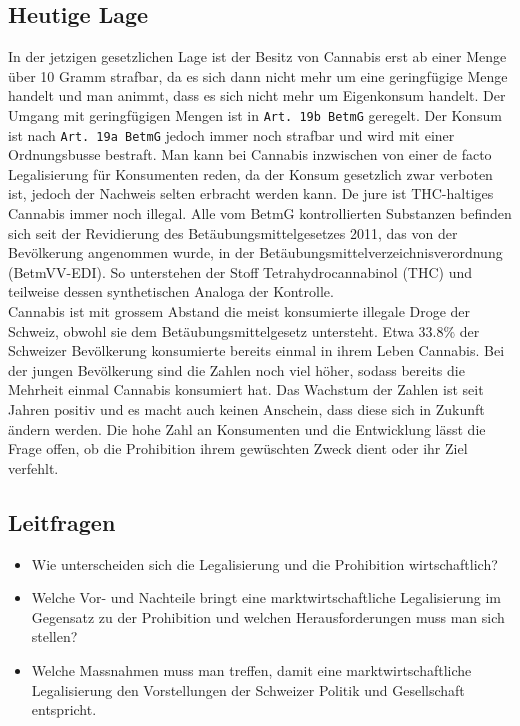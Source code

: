 \documentclass[../main.tex]{subfiles}
\begin{document}
	 
	 \subsection{Heutige Lage}
	 In der jetzigen gesetzlichen Lage ist der Besitz von Cannabis erst ab einer Menge über 10 Gramm strafbar, da es sich dann nicht mehr um eine geringfügige Menge handelt und man animmt, dass es sich nicht mehr um Eigenkonsum handelt.
	 Der Umgang mit geringfügigen Mengen ist in \texttt{Art. 19b BetmG} geregelt.
	 Der Konsum ist nach \texttt{Art. 19a BetmG} jedoch immer noch strafbar und wird mit einer Ordnungsbusse bestraft. 
	 Man kann bei Cannabis inzwischen von einer de facto Legalisierung für Konsumenten reden, da der Konsum gesetzlich zwar verboten ist, jedoch der Nachweis selten erbracht werden kann. 
	 De jure ist THC-haltiges Cannabis immer noch illegal. 
	 Alle vom BetmG kontrollierten Substanzen befinden sich seit der Revidierung des Betäubungsmittelgesetzes 2011, das von der Bevölkerung angenommen wurde, in der Betäubungsmittelverzeichnisverordnung (BetmVV-EDI). 
	 So unterstehen der Stoff Tetrahydrocannabinol (THC) und teilweise dessen synthetischen Analoga der Kontrolle.\\
	 
	 
	 \noindent
	 Cannabis ist mit grossem Abstand die meist konsumierte illegale Droge der Schweiz, obwohl sie dem Betäubungsmittelgesetz untersteht. 
	 Etwa $33.8\%$ der Schweizer Bevölkerung \cite{gmel} konsumierte bereits einmal in ihrem Leben Cannabis. 
	 Bei der jungen Bevölkerung sind die Zahlen noch viel höher, sodass bereits die Mehrheit einmal Cannabis konsumiert hat. 
	 Das Wachstum der Zahlen ist seit Jahren positiv und es macht auch keinen Anschein, dass diese sich in Zukunft ändern werden.
	 Die hohe Zahl an Konsumenten und die Entwicklung lässt die Frage offen, ob die Prohibition ihrem gewüschten Zweck dient oder ihr Ziel verfehlt.
	 
	 
	 \subsection{Leitfragen}
	 
	 \begin{itemize}
	 	\item Wie unterscheiden sich die Legalisierung und die Prohibition wirtschaftlich?
	 	\item Welche Vor- und Nachteile bringt eine marktwirtschaftliche Legalisierung im Gegensatz zu der Prohibition und welchen Herausforderungen muss man sich stellen?
	 	\item Welche Massnahmen muss man treffen, damit eine marktwirtschaftliche Legalisierung den Vorstellungen der Schweizer Politik und Gesellschaft entspricht.
	 \end{itemize}
\end{document}
